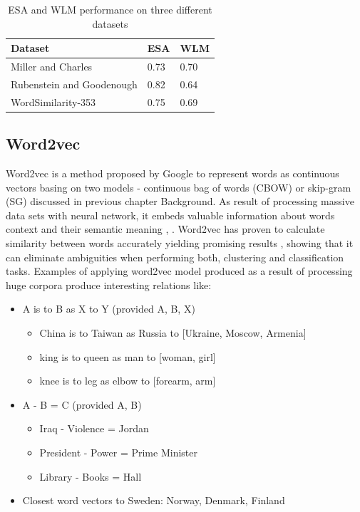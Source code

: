 \documentclass[a4paper, 12pt, oneside]{Thesis} %
\begin{document}
\begin{table}[th]
\centering
 \begin{tabular}{| l | l | l |}
 \hline
Dataset & ESA & WLM \\ \hline
Miller and Charles & 0.73 & 0.70 \\ \hline
Rubenstein and Goodenough & 0.82 & 0.64 \\ \hline
WordSimilarity-353 & 0.75 & 0.69  \\ \hline
 \end{tabular}
\caption{ESA and WLM performance on three different datasets}
\label{tab:esa-wlm}
\end{table}

\subsection{Word2vec} Word2vec is a method proposed by Google \cite{mikolov2013efficient} to represent words as continuous vectors basing on two models - continuous bag of words (CBOW) or skip-gram (SG) discussed in previous chapter Background. As result of processing massive data sets with neural network, it embeds valuable information about words context and their semantic meaning \cite{mikolov2013exploiting}, \cite{zou2013bilingual}. Word2vec has proven to calculate similarity between words accurately yielding promising results \cite{wolf2014joint}, showing that it can eliminate ambiguities when performing both, clustering and classification tasks. Examples of applying word2vec model produced as a result of processing huge corpora produce interesting relations like:

\begin{itemize}
\item A is to B as X to Y (provided A, B, X)
\begin{itemize}
\item China is to Taiwan as Russia to [Ukraine, Moscow, Armenia]
\item king is to queen as man to [woman, girl]
\item knee is to leg as elbow to [forearm, arm]
\end{itemize}
\item A - B = C (provided A, B)
\begin{itemize}
\item Iraq - Violence = Jordan
\item President - Power = Prime Minister
\item Library - Books = Hall
\end{itemize}
\item Closest word vectors to Sweden: Norway, Denmark, Finland
\end{itemize}
\end{document}
